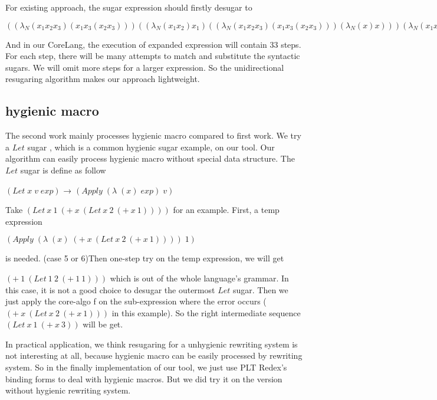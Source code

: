 For existing approach, the sugar expression should firstly desugar to
\begin{flushleft}
$((\lambda _{N}
   (x_{1} x_{2} x_{3})
   (x_{1} x_{3} (x_{2} x_{3})))
  ((\lambda _{N} (x_{1} x_{2}) x_{1})
   ((\lambda _{N}
     (x_{1} x_{2} x_{3})
     (x_{1} x_{3} (x_{2} x_{3})))
    (\lambda _{N} (x) x)))
  (\lambda _{N} (x_{1} x_{2}) x_{1})
  xx
  yy)$
\end{flushleft}

And in our CoreLang, the execution of expanded expression will contain 33 steps. For each step, there will be many attempts to match and substitute the syntactic sugars. We will omit more steps for a larger expression. So the unidirectional resugaring algorithm makes our approach lightweight.

\subsection{hygienic macro}
\label{mark:hygienic}

The second work\cite{hygienic} mainly processes hygienic macro compared to first work. We try a $Let$ sugar , which is a common hygienic sugar example, on our tool. Our algorithm can easily process hygienic macro without special data structure. The $Let$ sugar is define as follow

$(Let\;x\;v\;exp)$ → $(Apply\;(\lambda\;(x)\;exp)\;v)$

Take $(Let~x~1~(+~x~(Let~x~2~(+~x~1))))$ for an example. First, a temp expression

$(Apply\;(\lambda\;(x)\;(+~x~(Let~x~2~(+~x~1))))\;1)$

is needed. (case 5 or 6)Then one-step try on the temp expression, we will get

$(+~1~(Let~1~2~(+~1~1)))$ which is out of the whole language's grammar. In this case, it is not a good choice to desugar the outermost $Let$ sugar. Then we just apply the core-algo f on the sub-expression where the error occurs ($(+~x~(Let~x~2~(+~x~1)))$ in this example). So the right intermediate sequence $(Let~x~1~(+~x~3))$ will be get.

In practical application, we think resugaring for a unhygienic rewriting system is not interesting at all, because hygienic macro can be easily processed by rewriting system. So in the finally implementation of our tool, we just use PLT Redex's binding forms to deal with hygienic macros. But we did try it on the version without hygienic rewriting system.

